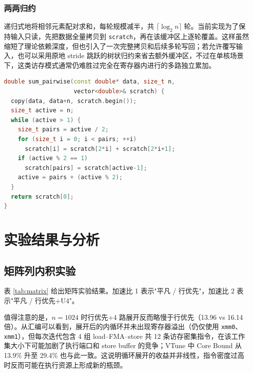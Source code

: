 \documentclass[a4paper,11pt,UTF8]{ctexart}
\begin{document}
\subsubsection{两两归约}
递归式地将相邻元素配对求和，每轮规模减半，共 $\lceil\log_2 n\rceil$ 轮。当前实现为了保持输入只读，先把数据全量拷贝到 \texttt{scratch}，再在该缓冲区上逐轮覆盖。这样虽然缩短了理论依赖深度，但也引入了一次完整拷贝和后续多轮写回；若允许覆写输入，也可以采用原地 stride 跳跃的树状归约来省去额外缓冲区，不过在单核场景下，这类访存模式通常仍难胜过完全在寄存器内进行的多路独立累加。

\begin{lstlisting}[language=C++,caption=两两归约]
double sum_pairwise(const double* data, size_t n,
                    vector<double>& scratch) {
  copy(data, data+n, scratch.begin());
  size_t active = n;
  while (active > 1) {
    size_t pairs = active / 2;
    for (size_t i = 0; i < pairs; ++i)
      scratch[i] = scratch[2*i] + scratch[2*i+1];
    if (active % 2 == 1)
      scratch[pairs] = scratch[active-1];
    active = pairs + (active % 2);
  }
  return scratch[0];
}
\end{lstlisting}

\section{实验结果与分析}
\subsection{矩阵列内积实验}
表 \ref{tab:matrix} 给出矩阵实验结果。加速比 1 表示"平凡 / 行优先"，加速比 2 表示"平凡 / 行优先+U4"。

值得注意的是，$n=1024$ 时行优先+4 路展开反而略慢于行优先（13.96 vs 16.14 倍）。从汇编可以看到，展开后的内循环并未出现寄存器溢出（仍仅使用 \texttt{xmm0}、\texttt{xmm1}），但每次迭代包含 4 组 load--FMA--store 共 12 条访存密集指令，在该工作集大小下可能加剧了执行端口和 store buffer 的竞争；VTune 中 Core Bound 从 13.9\% 升至 29.4\% 也与此一致。这说明循环展开的收益并非线性，指令密度过高时反而可能在执行资源上形成新的瓶颈。
\end{document}
